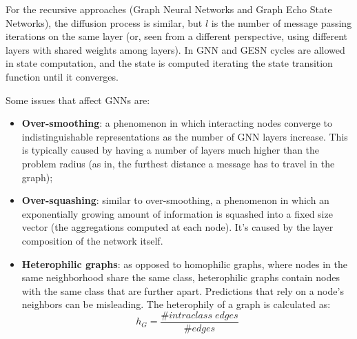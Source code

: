 For the recursive approaches (Graph Neural Networks and Graph Echo State Networks), the diffusion process is similar, but $l$ is the number of message passing iterations on the same layer (or, seen from a different perspective, using different layers with shared weights among layers). In GNN and GESN cycles are allowed in state computation, and the state is computed iterating the state transition function until it converges.

Some issues that affect GNNs are:
\begin{itemize}
    \item \textbf{Over-smoothing}: a phenomenon in which interacting nodes converge to indistinguishable representations as the number of GNN layers increase. This is typically caused by having a number of layers much higher than the problem radius (as in, the furthest distance a message has to travel in the graph);
    
    \item \textbf{Over-squashing}: similar to over-smoothing, a phenomenon in which an exponentially growing amount of information is squashed into a fixed size vector (the aggregations computed at each node). It's caused by the layer composition of the network itself.

    \item \textbf{Heterophilic graphs}: as opposed to homophilic graphs, where nodes in the same neighborhood share the same class, heterophilic graphs contain nodes with the same class that are further apart. Predictions that rely on a node's neighbors can be misleading. The heterophily of a graph is calculated as:
    \begin{equation*}
        h_G = \dfrac{\#intraclass\;edges}{\#edges}
    \end{equation*}
\end{itemize}

